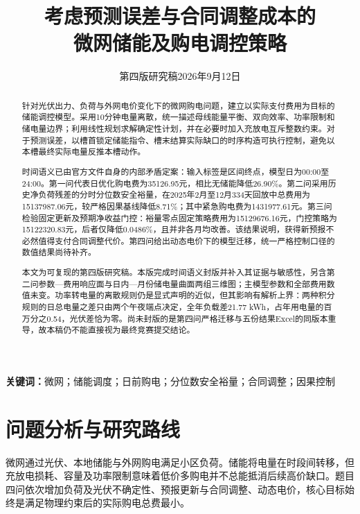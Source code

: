 \documentclass[UTF8,a4paper,zihao=-4,fontset=fandol]{ctexart}
\title{考虑预测误差与合同调整成本的\\微网储能及购电调控策略}
\author{}\date{第四版研究稿\quad 2026年9月12日}
\begin{document}
\maketitle\vspace{-2em}
\begin{abstract}
针对光伏出力、负荷与外网电价变化下的微网购电问题，建立以实际支付费用为目标的储能调控模型。采用10分钟电量离散，统一描述母线能量平衡、双向效率、功率限制和储电量边界；利用线性规划求解确定性计划，并在必要时加入充放电互斥整数约束。对于预测误差，以槽首锁定储能指令、槽末结算实际缺口的时序构造可执行控制，避免以本槽最终实际电量反推本槽动作。

时间语义已由官方文件自身的内部矛盾定案：输入标签是区间终点，模型日为00:00至24:00。第一问代表日优化购电费为35126.95元，相比无储能降低26.90\%。第二问采用历史净负荷残差的分时分位数安全裕量，在2025年2月至12月334天回放中总费用为15137987.06元，较严格因果基线降低8.71\%；其中紧急购电费为1431977.61元。第三问检验固定更新及预期净收益门控：裕量零点固定策略费用为15129676.16元，门控策略为15122320.83元，后者仅降低0.0486\%，且并非各月均改善。该结果说明，获得新预报不必然值得支付合同调整代价。第四问给出动态电价下的模型迁移，统一严格控制口径的数值结果尚待补齐。

本文为可复现的第四版研究稿。本版完成时间语义封版并补入其证据与敏感性，另含第二问参数—费用响应面与日内—月份储电量曲面两组三维图；主模型参数和全部费用数值未变。功率转电量的离散规则仍是显式声明的近似，但其影响有解析上界：两种积分规则的日总电量之差只由两个午夜端点决定，全年负载差21.77 kWh，占年用电量的百万分之0.54，光伏差恰为零。尚未封版的是第四问严格迁移与五份结果Excel的同版本重导，故本稿仍不能直接视为最终竞赛提交结论。
\end{abstract}
\noindent\textbf{关键词：}微网；储能调度；日前购电；分位数安全裕量；合同调整；因果控制
\newpage
\section{问题分析与研究路线}
微网通过光伏、本地储能与外网购电满足小区负荷。储能将电量在时段间转移，但充放电损耗、容量及功率限制意味着低价多购电并不总能抵消后续高价缺口。题目四问依次增加负荷及光伏不确定性、预报更新与合同调整、动态电价，核心目标始终是满足物理约束后的实际购电总费最小\cite{problem}。
\end{document}
